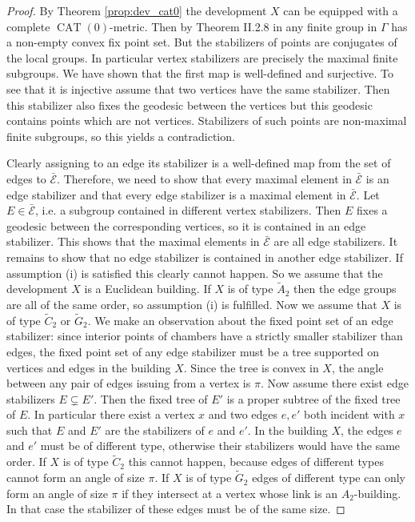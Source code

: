 \documentclass[dvipsnames]{article}
\theoremstyle{definition}
\theoremstyle{remark}
\DeclareMathOperator{\CAT}{CAT}
\begin{document}
    \begin{proof}
        By Theorem \ref{prop:dev_cat0} the development $X$ can be equipped with a complete $\CAT(0)$-metric. Then by Theorem II.2.8 in \cite{BridsonHaefliger} any finite group in $\Gamma$ has a non-empty convex fix point set.
        But the stabilizers of points are conjugates of the local groups.
        In particular vertex stabilizers are precisely the maximal finite subgroups.
        We have shown that the first map is well-defined and surjective. To see that it is injective assume that two vertices have the same stabilizer. Then this stabilizer also fixes the geodesic between the vertices but this geodesic contains points which are not vertices. Stabilizers of such points are non-maximal finite subgroups, so this yields a contradiction.

        Clearly assigning to an edge its stabilizer is a well-defined map from the set of edges to $\bar {\mathcal E}$.
        Therefore, we need to show that every maximal element in $\bar {\mathcal E}$ is an edge stabilizer and that every edge stabilizer is a maximal element in $\bar {\mathcal E}$.
        Let $E \in \bar {\mathcal E}$, i.e. a subgroup contained in different vertex stabilizers.
        Then $E$ fixes a geodesic between the corresponding vertices, so it is contained in an edge stabilizer.
        This shows that the maximal elements in $\bar{\mathcal E}$ are all edge stabilizers.
        It remains to show that no edge stabilizer is contained in another edge stabilizer.
        If assumption (i) is satisfied this clearly cannot happen. So we assume that the development $X$ is a Euclidean building.
        If $X$ is of type $\tilde A_2$ then the edge groups are all of the same order, so assumption (i) is fulfilled.
        Now we assume that $X$ is of type $\tilde C_2$ or $\tilde G_2$.
        We make an observation about the fixed point set of an edge stabilizer:
        since interior points of chambers have a strictly smaller stabilizer than edges, the fixed point set of any edge stabilizer must be a tree supported on vertices and edges in the building $X$.
        Since the tree is convex in $X$, the angle between any pair of edges issuing from a vertex is $\pi$.
        Now assume there exist edge stabilizers $E \subsetneq E'$.
        Then the fixed tree of $E'$ is a proper subtree of the fixed tree of $E$. In particular there exist a vertex $x$ and two edges $e,e'$ both incident with $x$ such that $E$ and $E'$ are the stabilizers of $e$ and $e'$.
        In the building $X$, the edges $e$ and $e'$ must be of different type, otherwise their stabilizers would have the same order. If $X$ is of type $\tilde C_2$ this cannot happen, because edges of different types cannot form an angle of size $\pi$. 
        If $X$ is of type $\tilde G_2$ edges of different type can only form an angle of size $\pi$ if they intersect at a vertex whose link is an $A_2$-building. In that case the stabilizer of these edges must be of the same size.
    \end{proof}
\end{document}
